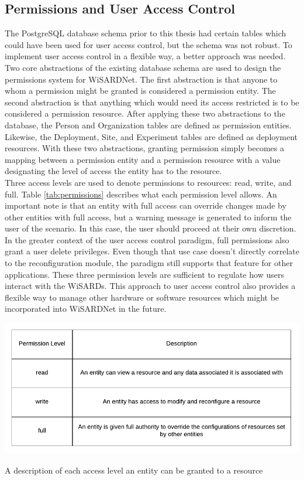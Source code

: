 \subsection{Permissions and User Access Control}
The PostgreSQL database schema prior to this thesis had certain tables which could have been used for user access control, but the schema was not robust. To implement user access control in a flexible way, a better approach was needed. Two core abstractions of the existing database schema are used to design the permissions system for WiSARDNet. The first abstraction is that anyone to whom a permission might be granted is considered a permission entity. The second abstraction is that anything which would need its access restricted is to be considered a permission resource. After applying these two abstractions to the database, the Person and Organization tables are defined as permission entities. Likewise, the Deployment, Site, and Experiment tables are defined as deployment resources. With these two abstractions, granting permission simply becomes a mapping between a permission entity and a permission resource with a value designating the level of access the entity has to the resource.\\ 

Three access levels are used to denote permissions to resources: read, write, and full. Table \ref{tab:permissions} describes what each permission level allows. An important note is that an entity with full access can override changes made by other entities with full access, but a warning message is generated to inform the user of the scenario. In this case, the user should proceed at their own discretion. In the greater context of the user access control paradigm, full permissions also grant a user delete privileges. Even though that use case doesn't directly correlate to the reconfiguration module, the paradigm still supports that feature for other applications. These three permission levels are sufficient to regulate how users  interact with the WiSARDs. This approach to user access control also provides a flexible way to manage other hardware or software resources which might be incorporated into WiSARDNet in the future.\\

\begin{table}[H]
	\centering
	\includegraphics[width=\textwidth]{figures/permission_table.png}
	\caption{A description of each access level an entity can be granted to a resource}
	\label{tab:permissions}
\end{table}

